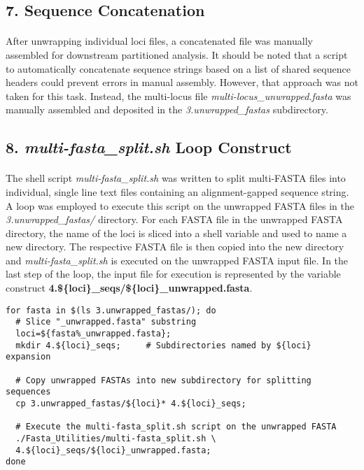 \vspace*{30pt}

\subsection*{7. Sequence Concatenation}

\paragraph{} After unwrapping individual loci files, a concatenated file was manually assembled for downstream partitioned analysis.  It should be noted that a script to automatically concatenate sequence strings based on a list of shared sequence headers could prevent errors in manual assembly.  However, that approach was not taken for this task.  Instead, the multi-locus file \textit{multi-locus\_unwrapped.fasta} was manually assembled and deposited in the \textit{3.unwrapped\_fastas} subdirectory.  

\subsection*{8. \textit{multi-fasta\_split.sh} Loop Construct}

\paragraph{} The shell script \textit{multi-fasta\_split.sh} was written to split multi-FASTA files into individual, single line text files containing an alignment-gapped sequence string.  A loop was employed to execute this script on the unwrapped FASTA files in the \textit{3.unwrapped\_fastas/} directory.  For each FASTA file in the unwrapped FASTA directory, the name of the loci is sliced into a shell variable and used to name a new directory.  The respective FASTA file is then copied into the new directory and \textit{multi-fasta\_split.sh} is executed on the unwrapped FASTA input file.  In the last step of the loop, the input file for execution is represented by the variable construct \textbf{4.\$\{loci\}\_seqs/\$\{loci\}\_unwrapped.fasta}.

\clearpage

\begin{lstlisting}[caption={textit{multi-fasta\_split.sh} Loop Contstruct}]
for fasta in $(ls 3.unwrapped_fastas/); do
  # Slice "_unwrapped.fasta" substring
  loci=${fasta%_unwrapped.fasta};   
  mkdir 4.${loci}_seqs;     # Subdirectories named by ${loci} expansion
  
  # Copy unwrapped FASTAs into new subdirectory for splitting sequences
  cp 3.unwrapped_fastas/${loci}* 4.${loci}_seqs;
  
  # Execute the multi-fasta_split.sh script on the unwrapped FASTA
  ./Fasta_Utilities/multi-fasta_split.sh \
  4.${loci}_seqs/${loci}_unwrapped.fasta;
done
\end{lstlisting}

